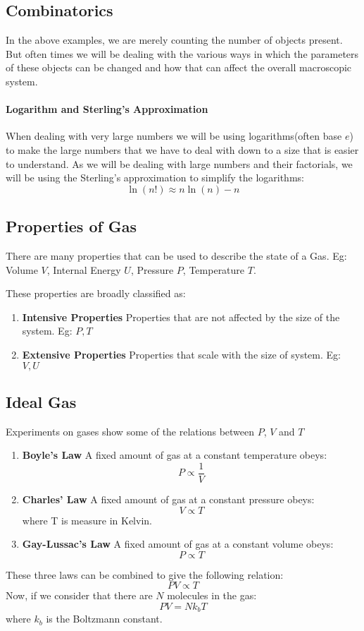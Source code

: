 \documentclass[12pt, oneside]{book}
\begin{document}
\subsection{Combinatorics}
In the above examples, we are merely counting the number of objects present.
But often times we will be dealing with the various ways in which the parameters of these objects can be changed and how that can affect the overall macroscopic system.

\paragraph{Logarithm and Sterling's Approximation} When dealing with very large numbers we will be using logarithms(often base \(e\)) to make the large numbers that we have to deal with down to a size that is easier to understand.
As we will be dealing with large numbers and their factorials, we will be using the Sterling's approximation to simplify the logarithms:
\[ \ln(n!) \approx n \ln(n) - n \]

\subsection{Properties of Gas}
There are many properties that can be used to describe the state of a Gas.
Eg: Volume \(V\), Internal Energy \(U\), Pressure \(P\), Temperature \(T\).

These properties are broadly classified as:
\begin{enumerate}
    \item \textbf{Intensive Properties} Properties that are not affected by the size of the system. Eg: \(P, T\)
    \item \textbf{Extensive Properties} Properties that scale with the size of system. Eg: \(V, U\)
\end{enumerate}

\subsection{Ideal Gas}
Experiments on gases show some of the relations between \(P\), \(V\) and \(T\)
\begin{enumerate}
    \item \textbf{Boyle's Law} A fixed amount of gas at a constant temperature obeys:
    \[P \propto \frac{1}{V}\]
    \item \textbf{Charles' Law} A fixed amount of gas at a constant pressure obeys:
    \[ V \propto T \]
    where T is measure in Kelvin.
    \item \textbf{Gay-Lussac's Law} A fixed amount of gas at a constant volume obeys:
    \[ P \propto T \]
\end{enumerate}
These three laws can be combined to give the following relation:
\[ PV \propto T \]
Now, if we consider that there are \(N\) molecules in the gas:
\[ PV = Nk_bT \]
where \(k_b\) is the Boltzmann constant.
\end{document}
